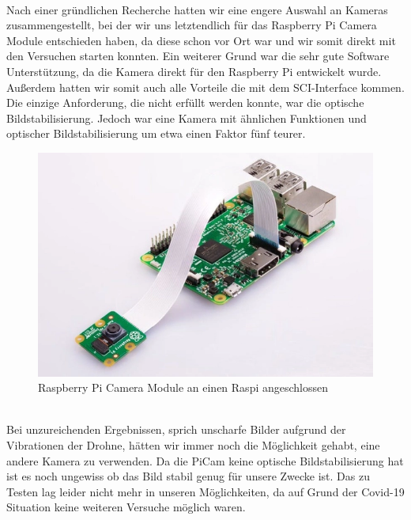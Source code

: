 \\
Nach einer gründlichen Recherche hatten wir eine engere Auswahl an Kameras zusammengestellt, bei der wir uns letztendlich für das Raspberry Pi Camera Module entschieden haben, da diese schon vor Ort war und wir somit direkt mit den Versuchen starten konnten. Ein weiterer Grund war die sehr gute Software Unterstützung, da die Kamera direkt für den Raspberry Pi entwickelt wurde. Außerdem hatten wir somit auch alle Vorteile die mit dem SCI-Interface kommen. Die einzige Anforderung, die nicht erfüllt werden konnte, war die optische Bildstabilisierung. Jedoch war eine Kamera mit ähnlichen Funktionen und optischer Bildstabilisierung um etwa einen Faktor fünf teurer.
\\
\begin{figure}[h]
	\centering
	\includegraphics[scale=0.6]{"Grafiken/PiCam.png"}
	\caption{Raspberry Pi Camera Module an einen Raspi angeschlossen\protect\footnotemark}
	\label{fig:picam}
\end{figure}
\\
Bei unzureichenden Ergebnissen, sprich unscharfe Bilder aufgrund der Vibrationen der Drohne, hätten wir immer noch die Möglichkeit gehabt, eine andere Kamera zu verwenden. Da die PiCam keine optische Bildstabilisierung hat ist es noch ungewiss ob das Bild stabil genug für unsere Zwecke ist. Das zu Testen lag leider nicht mehr in unseren Möglichkeiten, da auf Grund der Covid-19 Situation keine weiteren Versuche  möglich waren.
\newpage
